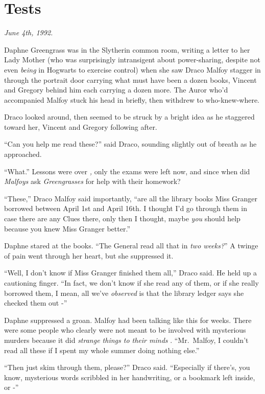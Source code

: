 \chapter{Tests}\label{tests}

\emph{June 4th, 1992.}

Daphne Greengrass was in the Slytherin common room, writing a letter to
her Lady Mother (who was surprisingly intransigent about power-sharing,
despite not even \emph{being} in Hogwarts to exercise control) when she
saw Draco Malfoy stagger in through the portrait door carrying what must
have been a dozen books, Vincent and Gregory behind him each carrying a
dozen more. The Auror who'd accompanied Malfoy stuck his head in
briefly, then withdrew to who-knew-where.

Draco looked around, then seemed to be struck by a bright idea as he
staggered toward her, Vincent and Gregory following after.

``Can you help me read these?'' said Draco, sounding slightly out of
breath as he approached.

``What.'' Lessons were over \emph{,} only the exams were left now, and
since when did \emph{Malfoys} ask \emph{Greengrasses} for help with
their homework?

``These,'' Draco Malfoy said importantly, ``are all the library books
Miss Granger borrowed between April 1st and April 16th. I thought I'd go
through them in case there are any Clues there, only then I thought,
maybe \emph{you} should help because you knew Miss Granger better.''

Daphne stared at the books. ``The General read all that in \emph{two
weeks?}'' A twinge of pain went through her heart, but she suppressed
it.

``Well, I don't know if Miss Granger finished them all,'' Draco said. He
held up a cautioning finger. ``In fact, we don't know if she read any of
them, or if she really borrowed them, I mean, all we've \emph{observed}
is that the library ledger says she checked them out -''

Daphne suppressed a groan. Malfoy had been talking like this for weeks.
There were some people who clearly were not meant to be involved with
mysterious murders because it did \emph{strange things to their minds} .
``Mr.~Malfoy, I couldn't read all these if I spent my whole summer doing
nothing else.''

``Then just skim through them, please?'' Draco said. ``Especially if
there's, you know, mysterious words scribbled in her handwriting, or a
bookmark left inside, or -''

